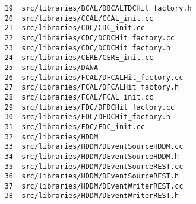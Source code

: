 \small
\begin{verbatim}
    19  src/libraries/BCAL/DBCALTDCHit_factory.h
    20  src/libraries/CCAL/CCAL_init.cc
    21  src/libraries/CDC/CDC_init.cc
    22  src/libraries/CDC/DCDCHit_factory.cc
    23  src/libraries/CDC/DCDCHit_factory.h
    24  src/libraries/CERE/CERE_init.cc
    25  src/libraries/DANA
    26  src/libraries/FCAL/DFCALHit_factory.cc
    27  src/libraries/FCAL/DFCALHit_factory.h
    28  src/libraries/FCAL/FCAL_init.cc
    29  src/libraries/FDC/DFDCHit_factory.cc
    30  src/libraries/FDC/DFDCHit_factory.h
    31  src/libraries/FDC/FDC_init.cc
    32  src/libraries/HDDM
    33  src/libraries/HDDM/DEventSourceHDDM.cc
    34  src/libraries/HDDM/DEventSourceHDDM.h
    35  src/libraries/HDDM/DEventSourceREST.cc
    36  src/libraries/HDDM/DEventSourceREST.h
    37  src/libraries/HDDM/DEventWriterREST.cc
    38  src/libraries/HDDM/DEventWriterREST.h
\end{verbatim}
